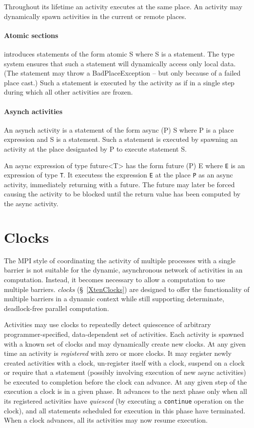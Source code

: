 Throughout its lifetime an activity executes at the same place. An
activity may dynamically spawn activities in the current or remote
places.

\paragraph{Atomic sections}

\Xten{} introduces statements of the form {\cf atomic S} where {\cf S}
is a statement.  The type system ensures that such a statement will
dynamically access only local data. (The statement may throw
a {\cf BadPlaceException} -- but only because of a failed place cast.)
Such a statement is executed by the activity as if in a single step
during which all other activities are frozen.

\paragraph{Asynch activities}

An asynch activity is a statement of the form {\cf async (P) S} where
{\cf P} is a place expression and {\cf S} is a statement.  Such a
statement is executed by spawning an activity at the place designated
by {\cf P} to execute statement {\cf S}.

An async expression of type {\cf future<T>} has the form {\cf future
(P) E} where {\tt E} is an expression of type {\tt T}. It executess
the expression {\tt E} at the place {\tt P} as an async activity,
immediately returning with a future. The future may later be forced
causing the activity to be blocked until the return value has been
computed by the async activity.

\section{Clocks}
The MPI style of coordinating the activity of multiple processes with
a single barrier is not suitable for the dynamic, asynchronous network
of activities in an \Xten{} computation. Instead, it becomes necessary
to allow a computation to use multiple barriers. \Xten{} {\em clocks}
(\S~\ref{XtenClocks}) are designed to offer the functionality of
multiple barriers in a dynamic context while still supporting
determinate, deadlock-free parallel computation.

Activities may use clocks to repeatedly detect quiescence of arbitrary
programmer-specified, data-dependent set of activities. Each activity
is spawned with a known set of clocks and may dynamically create new
clocks. At any given time an activity is {\em registered} with zero or
more clocks. It may register newly created activities with a clock,
un-register itself with a clock, suspend on a clock or require that a
statement (possibly involving execution of new async activities) be
executed to completion before the clock can advance.  At any given
step of the execution a clock is in a given phase. It advances to the
next phase only when all its registered activities have {\em quiesced}
(by executing a {\tt continue} operation on the clock), and all
statements scheduled for execution in this phase have terminated.
When a clock advances, all its activities may now resume execution.

